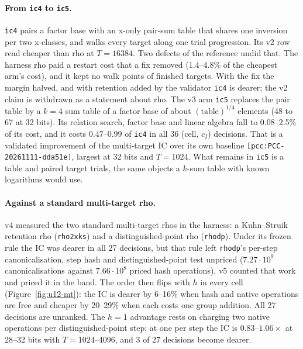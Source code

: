 \paragraph{From \texttt{ic4} to \texttt{ic5}.} \texttt{ic4} pairs a
factor base with an x-only pair-sum table that shares one inversion per two
x-classes, and walks every target along one trial progression. Its v2 row
read cheaper than rho at $T=16384$. Two defects of the reference undid that.
The harness rho paid a restart cost that a fix removed (1.4--4.8\% of the
cheapest arm's cost), and it kept no walk points of finished targets. With
the fix the margin halved, and with retention added by the validator
\texttt{ic4} is dearer; the v2 claim is withdrawn as a statement about rho.
The v3 arm \texttt{ic5} replaces the pair table by a $k=4$ sum table of a
factor base of about $(\text{table})^{1/4}$ elements (48 to 67 at 32 bits).
Its relation search, factor base and linear algebra fall to 0.08--2.5\% of
its cost, and it costs $0.47$--$0.99$ of \texttt{ic4} in all 36 (cell, $c_I$)
decisions. That is a validated improvement of the multi-target IC over its
own baseline \texttt{[pcc:PCC-20261111-dda51e]}, largest at 32 bits and
$T=1024$. What remains in \texttt{ic5} is a table and paired target trials,
the same objects a $k$-sum table with known logarithms would use.

\paragraph{Against a standard multi-target rho.} v4 measured the two
standard multi-target rhos in the harness: a Kuhn--Struik retention rho
(\texttt{rho2xks}) and a distinguished-point rho (\texttt{rhodp}). Under its
frozen rule the IC was dearer in all 27 decisions, but that rule left
\texttt{rhodp}'s per-step canonicalisation, step hash and distinguished-point
test unpriced ($7.27\cdot10^9$ canonicalisations against $7.66\cdot10^8$
priced hash operations). v5 counted that work and priced it in the band.
The order then flips with $h$ in every cell (Figure~\ref{fig:u12-mt}): the
IC is dearer by 6--16\% when hash and native operations are free and
cheaper by 20--29\% when each costs one group addition. All 27 decisions
are unranked. The $h=1$ advantage rests on charging two native operations
per distinguished-point step; at one per step the IC is $0.83$--$1.06\times$
at 28--32 bits with $T=1024$--$4096$, and 3 of 27 decisions become dearer.

